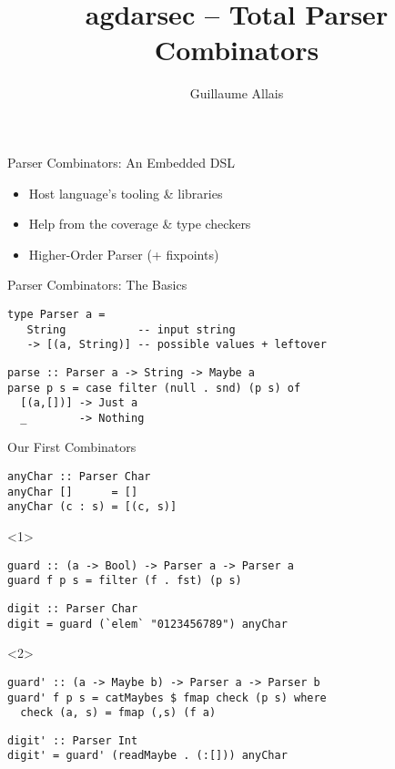 \documentclass{beamer}
\title{agdarsec -- Total Parser Combinators}
\author{Guillaume Allais}
\begin{document}
\maketitle

\begin{frame}{Parser Combinators: An Embedded DSL}

\begin{itemize}
  \item Host language's tooling \& libraries
  \item Help from the coverage \& type checkers
  \item Higher-Order Parser (+ fixpoints)
\end{itemize}

\end{frame}

\begin{frame}[fragile]{Parser Combinators: The Basics}

\begin{verbatim}
type Parser a =
   String           -- input string
   -> [(a, String)] -- possible values + leftover
\end{verbatim}

\begin{verbatim}
parse :: Parser a -> String -> Maybe a
parse p s = case filter (null . snd) (p s) of
  [(a,[])] -> Just a
  _        -> Nothing 
\end{verbatim}
\end{frame}

\begin{frame}[fragile]{Our First Combinators}
\begin{verbatim}
anyChar :: Parser Char
anyChar []      = []
anyChar (c : s) = [(c, s)]
\end{verbatim}
\begin{onlyenv}<1>
\begin{verbatim}
guard :: (a -> Bool) -> Parser a -> Parser a
guard f p s = filter (f . fst) (p s)
\end{verbatim}
\begin{verbatim}
digit :: Parser Char
digit = guard (`elem` "0123456789") anyChar
\end{verbatim}
\end{onlyenv}
\begin{onlyenv}<2>
\begin{verbatim}
guard' :: (a -> Maybe b) -> Parser a -> Parser b
guard' f p s = catMaybes $ fmap check (p s) where
  check (a, s) = fmap (,s) (f a)
\end{verbatim}
\begin{verbatim}
digit' :: Parser Int
digit' = guard' (readMaybe . (:[])) anyChar
\end{verbatim}
\end{onlyenv}
\end{frame}
\end{document}
